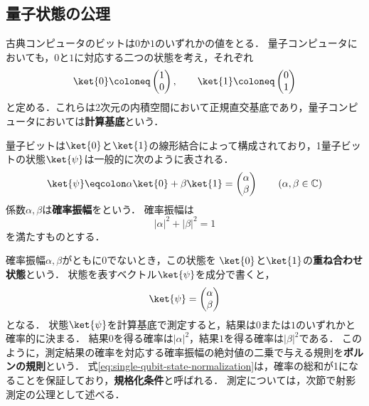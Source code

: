 \subsection{量子状態の公理}

\begin{defi}[計算基底]
古典コンピュータのビットは$0$か$1$のいずれかの値をとる．
量子コンピュータにおいても，$0$と$1$に対応する二つの状態を考え，それぞれ
\begin{equation*}
  \ket{0}\coloneq\begin{pmatrix}1\\0\end{pmatrix},
  \qquad
  \ket{1}\coloneq\begin{pmatrix}0\\1\end{pmatrix}
\end{equation*}
と定める．これらは2次元の内積空間において正規直交基底であり，量子コンピュータにおいては\textbf{計算基底}という．

量子ビットは$\ket{0}$と$\ket{1}$の線形結合によって構成されており，1量子ビットの状態$\ket{\psi}$は一般的に次のように表される．
\begin{equation*}
  \ket{\psi}\eqcolon\alpha\ket{0}+\beta\ket{1} = \begin{pmatrix}\alpha\\\beta\end{pmatrix}
  \qquad
  (\alpha,\beta\in\mathbb C)
\end{equation*}
係数$\alpha,\beta$は\textbf{確率振幅}をという．
確率振幅は
\begin{equation}
  |\alpha|^2+|\beta|^2=1
  \label{eq:single-qubit-state-normalization}
\end{equation}
を満たすものとする．
\end{defi}

確率振幅$\alpha,\beta$がともに$0$でないとき，この状態を
$\ket{0}$と$\ket{1}$の\textbf{重ね合わせ状態}という．
状態を表すベクトル$\ket{\psi}$を成分で書くと，
\begin{equation*}
  \ket{\psi}=
  \begin{pmatrix}
    \alpha\\\beta
  \end{pmatrix}
\end{equation*}
となる．
状態$\ket{\psi}$を計算基底で測定すると，結果は$0$または$1$のいずれかと確率的に決まる．
結果$0$を得る確率は$|\alpha|^2$，結果$1$を得る確率は$|\beta|^2$である．
このように，測定結果の確率を対応する確率振幅の絶対値の二乗で与える規則を\textbf{ボルンの規則}という．
式\eqref{eq:single-qubit-state-normalization}は，確率の総和が1になることを保証しており，\textbf{規格化条件}と呼ばれる．
測定については，次節で射影測定の公理として述べる．
